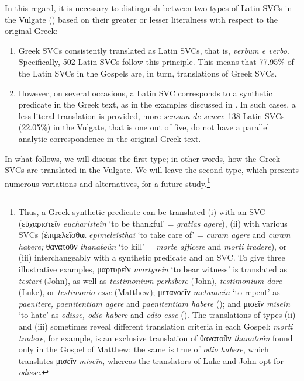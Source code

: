 \documentclass[output=paper,colorlinks,citecolor=brown]{langscibook}
\begin{document}

In this regard, it is necessary to distinguish between two types of Latin SVCs in the
Vulgate (\cite[68--69]{BañosJoséMiguel-2015311}) based on their greater or lesser
literalness with respect to the original Greek:

\begin{enumerate}
\renewcommand{\labelenumi}{(\roman{enumi})}
\item Greek SVCs consistently translated as Latin SVCs, that is, \emph{verbum e
    verbo}. Specifically, 502 Latin SVCs follow this principle. This means that 77.95\% of
  the Latin SVCs in the Gospels are, in turn, translations of Greek SVCs.

\item However, on several occasions, a Latin SVC corresponds to a synthetic predicate in
  the Greek text, as in the examples discussed in . In such cases, a less literal
  translation is provided, more \emph{sensum de sensu}: 138 Latin SVCs (22.05\%) in the
  Vulgate, that is one out of five, do not have a parallel analytic correspondence in
  the original Greek text.
\end{enumerate}

In what follows, we will discuss the first type; in other words, how the Greek SVCs are
translated in the Vulgate. We will leave the second type, which presents numerous
variations and alternatives, for a future study.\footnote{Thus, a Greek synthetic
  predicate can be translated (i) with an SVC (εὐχαριστεῖν \emph{eucharisteîn} `to be
  thankful' = \emph{gratias agere}), (ii) with various SVCs (ἐπιμελεῖσθαι
  \emph{epimeleîsthai} `to take care of' = \emph{curam agere} and \emph{curam habere;}
  θανατοῦν \emph{thanatoûn} `to kill' = \emph{morte afficere} and \emph{morti tradere}), or
  (iii) interchangeably with a synthetic predicate and an SVC. To give three illustrative
  examples, μαρτυρεῖν \emph{martyreîn} `to bear witness' is translated as \emph{testari}
  (John), as well as \emph{testimonium perhibere} (John), \emph{testimonium dare} (Luke), or
  \emph{testimonio esse} (Matthew); μετανοεῖν \emph{metanoeîn} `to repent' as
  \emph{paenitere, paenitentiam agere} and \emph{paenitentiam habere}
  (\cite{BañosJiménezLópez2017a}); and μισεῖν \emph{miseîn} `to hate' as \emph{odisse,
    odio habere} and \emph{odio esse} (\cite{BañosJiménezLópez2017b}). The translations of
  types (ii) and (iii) sometimes reveal different translation criteria in each Gospel:
  \emph{morti tradere}, for example, is an exclusive translation of θανατοῦν
  \emph{thanatoûn} found only in the Gospel of Matthew; the same is true of \emph{odio
    habere}, which translates μισεῖν \emph{miseîn}, whereas the translators of Luke and
  John opt for \emph{odisse}.}
\end{document}
